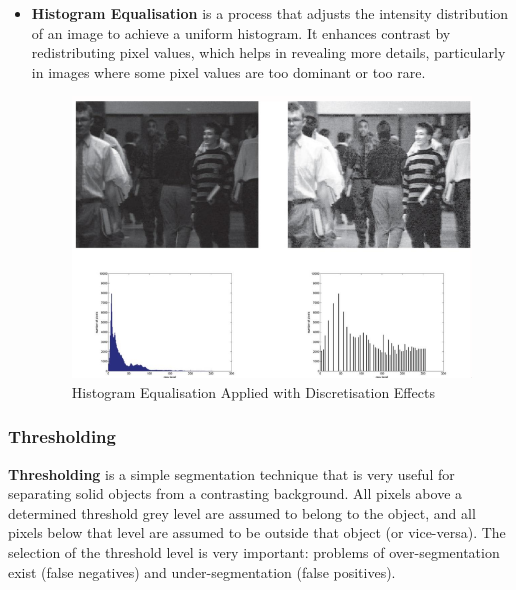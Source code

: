 \documentclass[a4paper,11pt]{article}
\begin{document}
\begin{itemize}
    \item   \textbf{Histogram Equalisation} is a process that adjusts the intensity distribution of an image to achieve a uniform histogram.
            It enhances contrast by redistributing pixel values, which helps in revealing more details, particularly in images where some pixel values are too dominant or too rare.

            \begin{minipage}{\linewidth}
                \begin{figure}[H]
                    \centering
                    \includegraphics[width=\linewidth]{images/hoop_dreams.png}
                    \caption{Histogram Equalisation Applied with Discretisation Effects}
                \end{figure}
            \end{minipage}
\end{itemize}

\subsubsection{Thresholding}
\textbf{Thresholding} is a simple segmentation technique that is very useful for separating solid objects from a contrasting background.
All pixels above a determined threshold grey level are assumed to belong to the object, and all pixels below that level are assumed to be outside that object (or vice-versa).
The selection of the threshold level is very important: problems of over-segmentation exist (false negatives) and under-segmentation (false positives).
\end{document}
